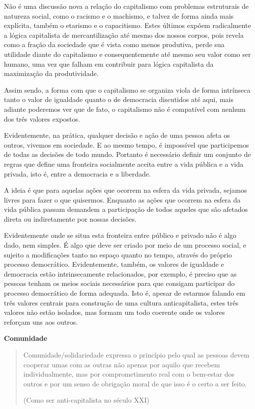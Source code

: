 Não é uma discussão nova a relação do capitalismo com problemas estruturais de natureza social, como o racismo e o machismo, e talvez de forma ainda mais explícita, também o  etarismo e o capacitismo. Estes últimos expõem radicalmente a lógica capitalista de mercantilização até mesmo dos nossos corpos, pois revela como a fração da sociedade que é vista como menos produtiva, perde sua utilidade diante do capitalismo e consequentemente até mesmo seu valor como ser humano, uma vez que falham em contribuir para lógica capitalista da maximização da produtividade.

Assim sendo, a forma com que o capitalismo se organiza viola de forma intrínseca tanto o valor de igualdade quanto o de democracia discutidos até aqui, mais adiante poderemos ver que de fato, o capitalismo não é compatível com nenhum dos três valores expostos.

Evidentemente, na prática, qualquer decisão e ação de uma pessoa afeta os outros, vivemos em sociedade. E ao mesmo tempo, é impossível que participemos de todas as decisões de todo mundo. Portanto é necessário definir um conjunto de regras que define uma fronteira socialmente aceita entre a vida pública e a vida privada, isto é, entre a democracia e a liberdade. 

A ideia é que para aquelas ações que ocorrem na esfera da vida privada, sejamos livres para fazer o que quisermos. Enquanto as ações que ocorrem na esfera da vida pública passam demandem a participação  de todos aqueles que são afetados direta ou indiretamente por nossas decisões. 

Evidentemente onde se situa esta fronteira entre público e privado não é algo dado, nem simples. É algo que deve ser criado por meio de um processo social, e sujeito a modificações tanto no espaço quanto no tempo, através do próprio processo democrático. Evidentemente, também, os valores de igualdade e democracia estão intrinsecamente relacionados, por exemplo, é preciso que as pessoas tenham os meios sociais necessários para que consigam participar do processo democrático de forma adequada. Isto é, apesar de estarmos falando em três valores centrais para construção de uma cultura anticapitalista, estes três valores não estão isolados, mas formam um todo coerente onde os valores reforçam uns aos outros.

\textbf{Comunidade}

\begin{quote}
Comunidade/solidariedade expressa o princípio pelo qual as pessoas devem cooperar umas com as outras não apenas por aquilo que recebem individualmente, mas por comprometimento real com o bem-estar dos outros e por um senso de obrigação moral de que isso é o certo a ser feito.

(Como ser anti-capitalista no século XXI)
\end{quote}

